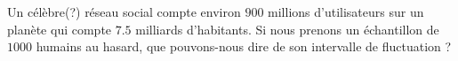 
\begin{exercice}\label{exosmath-0333}

    Un célèbre(?) réseau social compte environ \( 900\) millions d'utilisateurs sur un planète qui compte \( 7.5\) milliards d'habitants. Si nous prenons un échantillon de \( 1000\) humains au hasard, que pouvons-nous dire de son intervalle de fluctuation ?

\end{exercice}
